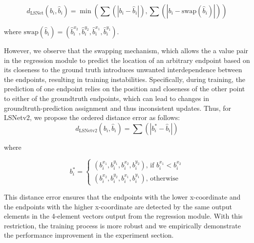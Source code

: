 \documentclass[journal]{IEEEtran}
\begin{document}
\begin{equation}
  d_{\text{LSNet}}(b_i, \hat{b}_i) = \min(\sum (|b_i - \hat{b}_i|), \sum(|b_i - \text{swap}(\hat{b}_i)|))
\end{equation}

\noindent where $\text{swap}(\hat{b}_i) = (\hat{b}_i^{x_2}, \hat{b}_i^{y_2}, \hat{b}_i^{x_1}, \hat{b}_i^{y_1})$.

However, we observe that the swapping mechanism, which allows the a value pair in the regression module to predict the location of an arbitrary endpoint based on its closeness to the ground truth introduces unwanted interdependence between the endpoints, resulting in training instabilities. Specifically, during training, the prediction of one endpoint relies on the position and closeness of the other point to either of the groundtruth endpoints, which can lead to changes in groundtruth-prediction assignment and thus inconsistent updates.
Thus, for LSNetv2, we propose the ordered distance error as follows:
\begin{equation}
  d_{\text{LSNetv2}}(b_i, \hat{b}_i) = \sum (|b^*_i - \hat{b}_i|)
\end{equation}

\noindent where 

\begin{equation}
  b^*_i=
    \begin{cases}
       (b_i^{x_1}, b_i^{y_1}, b_i^{x_2}, b_i^{y_2}) \text{, if } b_i^{x_1} < b_i^{x_2} \\
       (b_i^{x_2}, b_i^{y_2}, b_i^{x_1}, b_i^{y_1}) \text{, otherwise }
    \end{cases}       
\end{equation}

This distance error ensures that the endpoints with the lower x-coordinate and the endpoints with the higher x-coordinate are detected by the same output elements in the 4-element vectors output from the regression module. With this restriction, the training process is more robust and we empirically demonstrate the performance improvement in the experiment section.
\end{document}
